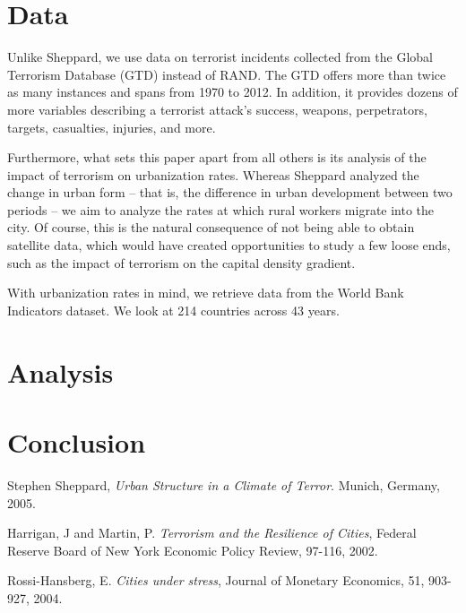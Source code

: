 \documentclass[preprint,2p,12pt]{elsarticle}
\begin{document}
\section{\sc Data}
Unlike Sheppard, we use data on terrorist incidents collected from the Global Terrorism Database (GTD) instead of RAND. The GTD offers more than twice as many instances and spans from 1970 to 2012. In addition, it provides dozens of more variables describing a terrorist attack's success, weapons, perpetrators, targets, casualties, injuries, and more.

Furthermore, what sets this paper apart from all others is its analysis of the impact of terrorism on urbanization rates. Whereas Sheppard analyzed the change in urban form -- that is, the difference in urban development between two periods -- we aim to analyze the rates at which rural workers migrate into the city. Of course, this is the natural consequence of not being able to obtain satellite data, which would have created opportunities to study a few loose ends, such as the impact of terrorism on the capital density gradient. 

With urbanization rates in mind, we retrieve data from the World Bank Indicators dataset. We look at 214 countries across 43 years.


\section{Analysis}


\section{Conclusion}


\begin{thebibliography}{9}

  Stephen Sheppard,
  \emph{Urban Structure in a Climate of Terror}.
  Munich, Germany,
  2005.

  Harrigan, J and Martin, P.
  \emph{Terrorism and the Resilience of Cities},
  Federal Reserve Board of New York Economic Policy Review,
  97-116,
  2002.

  Rossi-Hansberg, E.
  \emph{Cities under stress},
  Journal of Monetary Economics,
  51, 903-927,
  2004.

\end{thebibliography}
\end{document}
